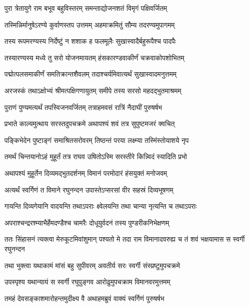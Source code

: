 
\twolineshloka
{पुरा त्रेतायुगे राम बभूव बहुविस्तरम्}
{समन्ताद्योजनशतं विमृगं पक्षिवर्जितम्} %

\twolineshloka
{तस्मिन्निर्मानुषेऽरण्ये कुर्वाणस्तप उत्तमम्}
{अहमाक्रमितुं सौम्य तदरण्यमुपागमम्} %

\twolineshloka
{तस्य रूपमरण्यस्य निर्देष्टुं न शशाक ह}
{फलमूलैः सुखास्वादैर्बहुरूपैश्च पादपैः} %

\twolineshloka
{तस्यारण्यस्य मध्ये तु सरो योजनमायतम्}
{हंसकारण्डवाकीर्णं चक्रवाकोपशोभितम्} %

\twolineshloka
{पद्मोत्पलसमाकीर्णं समतिक्रान्तशैवलम्}
{तदाश्चर्यमिवात्यर्थं सुखास्वादमनुत्तमम्} %

\twolineshloka
{अरजस्कं तथाऽक्षोभ्यं श्रीमत्पक्षिगणायुतम्}
{समीपे तस्य सरसो महदद्भुतमाश्रमम्} %

\twolineshloka
{पुराणं पुण्यमत्यर्थं तपस्विजनवर्जितम्}
{तत्राहमवसं रात्रिं नैदाघीं पुरुषर्षभ} %

\twolineshloka
{प्रभाते काल्यमुत्थाय सरस्तदुपचक्रमे}
{अथापश्यं शवं तत्र सुपुष्टमजरं क्वचित्} %

\twolineshloka
{पङ्किभेदेन पुष्टाङ्गं समाश्रितसरोवरम्}
{तिष्ठन्तं परया लक्ष्म्या तस्मिंस्तोयाशये नृप} %

\twolineshloka
{तमर्थं चिन्तयानोऽहं मुहूर्तं तत्र राघव}
{उषितोऽस्मि सरस्तीरे किन्न्विदं स्यादिति प्रभो} %

\twolineshloka
{अथापश्यं मुहूर्तेन दिव्यमद्भुतदर्शनम्}
{विमानं परमोदारं हंसयुक्तं मनोजवम्} %

\twolineshloka
{अत्यर्थं स्वर्गिणं त विमाने रघुनन्दन}
{उपास्तेऽप्सरसां वीर सहस्रं दिव्यभूषणम्} %

\twolineshloka
{गायन्ति दिव्यगेयानि वादयन्ति तथाऽपराः}
{क्ष्वेलयन्ति तथा चान्या नृत्यन्ति च तथाऽपराः} %

\twolineshloka
{अपराश्चन्द्ररश्म्याभैर्हेमदण्डैश्च चामरैः}
{दोधूयुर्वदनं तस्य पुण्डरीकनिभेक्षणम्} %

\threelineshloka
{ततः सिंहासनं त्यक्त्वा मेरुकूटमिवांशुमान्}
{पश्यतो मे तदा राम विमानादवरुह्य च}
{तं शवं भक्षयामास स स्वर्गी रघुनन्दन} %

\twolineshloka
{तथा भुक्त्वा यथाकामं मांसं बहु सुपीवरम्}
{अवतीर्य सरः स्वर्गी संस्प्रष्टुमुपचक्रमे} %

\twolineshloka
{उपस्पृश्य यथान्यायं स स्वर्गी रघुपुङ्गव}
{आरोढुमुपचक्राम विमानवरमुत्तमम्} %

\twolineshloka
{तमहं देवसङ्काशमारोहन्तमुदीक्ष्य वै}
{अथाहमब्रुवं वाक्यं स्वर्गिणं पुरुषर्षभ} %

